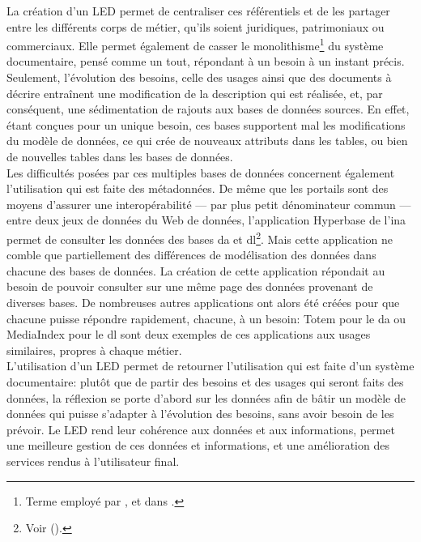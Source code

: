 La création d'un LED permet de centraliser ces référentiels et de les partager entre les différents corps de métier, qu'ils soient juridiques, patrimoniaux ou commerciaux. Elle permet également de casser le monolithisme\footnote{Terme employé par ,  et  dans \cite{bermes_cas_2013}.} du système documentaire, pensé comme un tout, répondant à un besoin à un instant précis. Seulement, l'évolution des besoins, celle des usages ainsi que des documents à décrire entraînent une modification de la description qui est réalisée, et, par conséquent, une sédimentation de rajouts aux bases de données sources. En effet, étant conçues pour un unique besoin, ces bases supportent mal les modifications du modèle de données, ce qui crée de nouveaux attributs dans les tables, ou bien de nouvelles tables dans les bases de données.\\

Les difficultés posées par ces multiples bases de données concernent également l'utilisation qui est faite des métadonnées. De même que les portails sont des moyens d'assurer une interopérabilité --- par plus petit dénominateur commun --- entre deux jeux de données du Web de données, l'application Hyperbase de l'\ac{ina} permet de consulter les données des bases \ac{da} et \ac{dl}\footnote{Voir  ().}. Mais cette application ne comble que partiellement des différences de modélisation des données dans chacune des bases de données. La création de cette application répondait au besoin de pouvoir consulter sur une même page des données provenant de diverses bases. De nombreuses autres applications ont alors été créées pour que chacune puisse répondre rapidement, chacune, à un besoin: Totem pour le \ac{da} ou MediaIndex pour le \ac{dl} sont deux exemples de ces applications aux usages similaires, propres à chaque métier.\\

L'utilisation d'un LED permet de retourner l'utilisation qui est faite d'un système documentaire: plutôt que de partir des besoins et des usages qui seront faits des données, la réflexion se porte d'abord sur les données afin de bâtir un modèle de données qui puisse s'adapter à l'évolution des besoins, sans avoir besoin de les prévoir. Le LED rend leur cohérence aux données et aux informations, permet une meilleure gestion de ces données et informations, et une amélioration des services rendus à l'utilisateur final.


